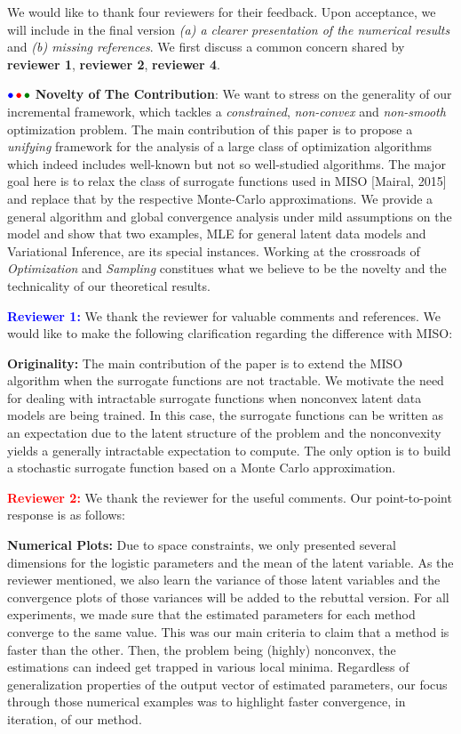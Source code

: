 \documentclass{article}
\begin{document}
We would like to thank four reviewers for their feedback. Upon acceptance, we will include in the final version \emph{{\sf (a)} a clearer presentation of the numerical results} and \emph{{\sf (b)} missing references}. 
We first discuss a common concern shared by \textbf{\color{blue}reviewer 1}, \textbf{\color{red} reviewer 2}, \textbf{\color{green!50!black}reviewer 4}.

${\color{blue}\bullet}\!~{\color{red}\bullet}\!~{\color{green!50!black}\bullet}$ \textbf{Novelty of The Contribution}: 
We want to stress on the generality of our incremental framework, which tackles a \emph{constrained}, \emph{non-convex} and \emph{non-smooth} optimization problem. 
The main contribution of this paper is to propose a \emph{unifying} framework for the analysis of a large class of optimization algorithms which indeed includes well-known but not so well-studied algorithms.
The major goal here is to relax the class of surrogate functions used in MISO [Mairal, 2015] and replace that by the respective Monte-Carlo approximations.
We provide a general algorithm and global convergence analysis under mild assumptions on the model and show that two examples, MLE for general latent data models and Variational Inference, are its special instances.
Working at the crossroads of \emph{Optimization} and \emph{Sampling} constitues what we believe to be the novelty and the technicality of our theoretical results.


\textbf{\textcolor{blue}{Reviewer 1:}} We thank the reviewer for valuable comments and references. We would like to make the following clarification regarding the difference with MISO:

\textbf{Originality:} The main contribution of the paper is to extend the MISO algorithm when the surrogate functions are not tractable. 
We motivate the need for dealing with intractable surrogate functions when nonconvex latent data models are being trained. 
In this case, the surrogate functions can be written as an expectation due to the latent structure of the problem and the nonconvexity yields a generally intractable expectation to compute. 
The only option is to build a stochastic surrogate function based on a Monte Carlo approximation.


\textbf{\textcolor{red}{Reviewer 2:}} We thank the reviewer for the useful comments. Our point-to-point response is as follows:

\textbf{Numerical Plots:} Due to space constraints, we only presented several dimensions for the logistic parameters and the mean of the latent variable. 
As the reviewer mentioned, we also learn the variance of those latent variables and the convergence plots of those variances will be added to the rebuttal version.
For all experiments, we made sure that the estimated parameters for each method converge to the same value. 
This was our main criteria to claim that a method is faster than the other. 
Then, the problem being (highly) nonconvex, the estimations can indeed get trapped in various local minima. 
Regardless of generalization properties of the output vector of estimated parameters, our focus through those numerical examples was to highlight faster convergence, in iteration, of our method.
\end{document}
